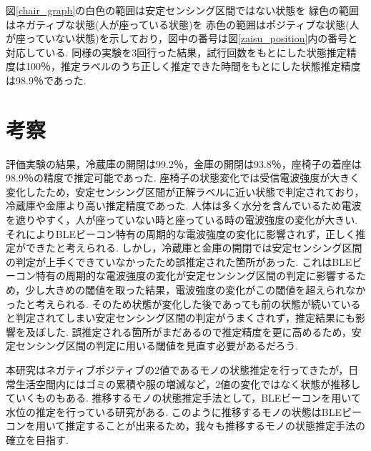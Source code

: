 \documentclass[Japanese]{dicomopapers}
\begin{document}
図\ref{chair_graph}の白色の範囲は安定センシング区間ではない状態を 緑色の範囲はネガティブな状態(人が座っている状態)を 赤色の範囲はポジティブな状態(人が座っていない状態)を示しており，図中の番号は図\ref{zaisu_position}内の番号と対応している.
同様の実験を3回行った結果，試行回数をもとにした状態推定精度は100％，推定ラベルのうち正しく推定できた時間をもとにした状態推定精度は98.9％であった.


\section{考察}
評価実験の結果，冷蔵庫の開閉は99.2％，金庫の開閉は93.8％，座椅子の着座は98.9％の精度で推定可能であった.
座椅子の状態変化では受信電波強度が大きく変化したため，安定センシング区間が正解ラベルに近い状態で判定されており，冷蔵庫や金庫より高い推定精度であった.
人体は多く水分を含んでいるため電波を遮りやすく，人が座っていない時と座っている時の電波強度の変化が大きい.
それによりBLEビーコン特有の周期的な電波強度の変化に影響されず，正しく推定ができたと考えられる.
しかし，冷蔵庫と金庫の開閉では安定センシング区間の判定が上手くできていなかったため誤推定された箇所があった.
これはBLEビーコン特有の周期的な電波強度の変化が安定センシング区間の判定に影響するため，少し大きめの閾値を取った結果，電波強度の変化がこの閾値を超えられなかったと考えられる.
そのため状態が変化した後であっても前の状態が続いていると判定されてしまい安定センシング区間の判定がうまくされず，推定結果にも影響を及ぼした.
誤推定される箇所がまだあるので推定精度を更に高めるため，安定センシング区間の判定に用いる閾値を見直す必要があるだろう.



本研究はネガティブポジティブの2値であるモノの状態推定を行ってきたが，日常生活空間内にはゴミの累積や服の増減など，2値の変化ではなく状態が推移していくものもある.
推移するモノの状態推定手法として，BLEビーコンを用いて水位の推定を行っている研究がある\cite{BLEwaterLevel}.
このように推移するモノの状態はBLEビーコンを用いて推定することが出来るため，我々も推移するモノの状態推定手法の確立を目指す.


\end{document}
